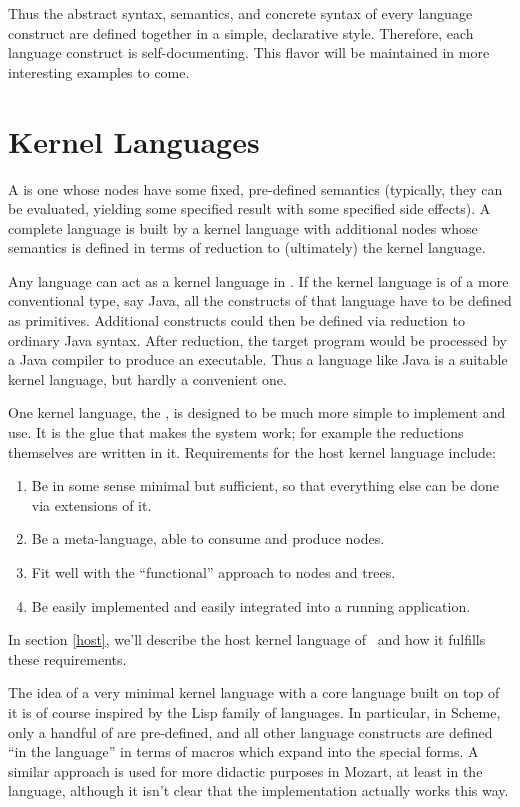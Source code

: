 Thus the abstract syntax, semantics, and concrete syntax of every language construct are defined together in a simple, declarative style. Therefore, each language construct is self-documenting. This flavor will be maintained in more interesting examples to come.

%
%

\section{Kernel Languages}
A  is one whose nodes have some fixed, pre-defined semantics (typically, they can be evaluated, yielding some specified result with some specified side effects). A complete language is built by  a kernel language with additional nodes whose semantics is defined in terms of reduction to (ultimately) the kernel language.

Any language can act as a kernel language in \Meta. If the kernel language is of a more conventional type, say Java, all the constructs of that language have to be defined as primitives. Additional constructs could then be defined via reduction to ordinary Java syntax. After reduction, the target program would be processed by a Java compiler to produce an executable. Thus a language like Java is a suitable kernel language, but hardly a convenient one.

One kernel language, the , is designed to be much more simple to implement and use. It is the glue that makes the system work; for example the reductions themselves are written in it. Requirements for the host kernel language include:
\begin{enumerate}
\item Be in some sense minimal but sufficient, so that everything else can be done via extensions of it.
\item Be a meta-language, able to consume and produce nodes.
\item Fit well with the ``functional'' approach to nodes and trees.
\item Be easily implemented and easily integrated into a running application.
\end{enumerate}

In section \ref{host}, we'll describe the host kernel language of \Meta\ and how it fulfills these requirements.

The idea of a very minimal kernel language with a core language built on top of it is of course inspired by the Lisp family of languages. In particular, in Scheme\cite{scheme}, only a handful of  are pre-defined, and all other language constructs are defined ``in the language'' in terms of macros which expand into the special forms. A similar approach is used for more didactic purposes in Mozart\cite{mozart}, at least in  the language, although it isn't clear that the implementation actually works this way.

